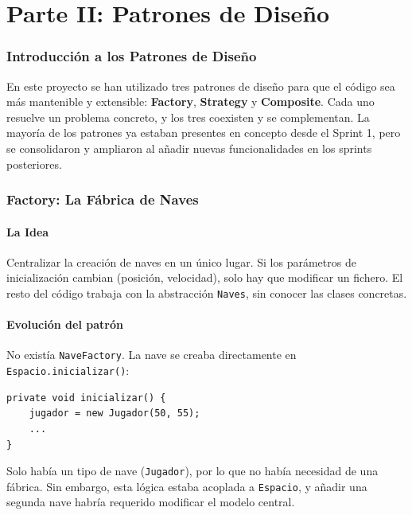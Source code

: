 \documentclass[12pt, a4paper]{article}
\begin{document}
\newpage
 
\part*{Parte II: Patrones de Dise\~{n}o}
 
\section{Introducci\'{o}n a los Patrones de Dise\~{n}o}
 
En este proyecto se han utilizado tres patrones de dise\~{n}o para que el c\'{o}digo sea m\'{a}s mantenible y extensible: \textbf{Factory}, \textbf{Strategy} y \textbf{Composite}. Cada uno resuelve un problema concreto, y los tres coexisten y se complementan. La mayor\'{i}a de los patrones ya estaban presentes en concepto desde el Sprint 1, pero se consolidaron y ampliaron al a\~{n}adir nuevas funcionalidades en los sprints posteriores.
 
\section{Factory: La F\'{a}brica de Naves}
 
\subsection{La Idea}
 
Centralizar la creaci\'{o}n de naves en un \'{u}nico lugar. Si los par\'{a}metros de inicializaci\'{o}n cambian (posici\'{o}n, velocidad), solo hay que modificar un fichero. El resto del c\'{o}digo trabaja con la abstracci\'{o}n \texttt{Naves}, sin conocer las clases concretas.
 
\subsection{Evoluci\'{o}n del patr\'{o}n}
 
\begin{cajasprint1}
No exist\'{i}a \texttt{NaveFactory}. La nave se creaba directamente en \texttt{Espacio.inicializar()}:
\begin{lstlisting}
private void inicializar() {
    jugador = new Jugador(50, 55);
    ...
}
\end{lstlisting}
Solo hab\'{i}a un tipo de nave (\texttt{Jugador}), por lo que no hab\'{i}a necesidad de una f\'{a}brica. Sin embargo, esta l\'{o}gica estaba acoplada a \texttt{Espacio}, y a\~{n}adir una segunda nave habr\'{i}a requerido modificar el modelo central.
\end{cajasprint1}
 
\end{document}
